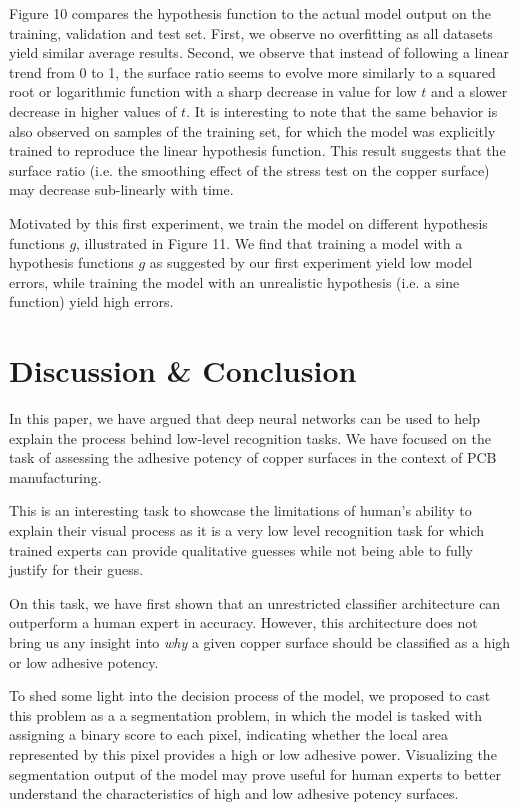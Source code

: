 \documentclass[10pt,twocolumn,letterpaper]{article}
\begin{document}
Figure 10 compares the hypothesis function to the actual model output on the training, 
validation and test set.
First, we observe no overfitting as all datasets yield similar average results.
Second, we observe that instead of following a linear trend from 0 to 1, 
the surface ratio seems to evolve more similarly to a squared root or logarithmic function
with a sharp decrease in value for low $t$ and a slower decrease in higher values of $t$.
It is interesting to note that the same behavior is also observed on samples of the training set, 
for which the model was explicitly trained to reproduce the linear hypothesis function.
This result suggests that the surface ratio 
(i.e. the smoothing effect of the stress test on the copper surface) 
may decrease sub-linearly with time.


Motivated by this first experiment, 
we train the model on different hypothesis functions $g$,
illustrated in Figure 11.
We find that training a model with a hypothesis functions $g$ as suggested by our first experiment
yield low model errors, while training the model with an unrealistic hypothesis (i.e. a sine function)
yield high errors. 

\section{Discussion \& Conclusion}

In this paper, we have argued that deep neural networks can be used to 
help explain the process behind low-level recognition tasks.
We have focused on the task of assessing the adhesive potency 
of copper surfaces in the context of PCB manufacturing.

This is an interesting task to showcase the limitations of human's ability to explain their visual process
as it is a very low level recognition task for which trained experts can provide qualitative guesses while
not being able to fully justify for their guess.

On this task, we have first shown that an unrestricted classifier 
architecture can outperform a human expert in accuracy.
However, this architecture does not bring us any insight 
into \textit{why} a given copper surface should be classified 
as a high or low adhesive potency.

To shed some light into the decision process of the model,
we proposed to cast this problem as a a segmentation problem, 
in which the model is tasked with assigning a binary score to each pixel,
indicating whether the local area represented by this pixel provides a high or low adhesive power.
Visualizing the segmentation output of the model may prove useful for 
human experts to better understand the characteristics of high and low 
adhesive potency surfaces.
\end{document}
